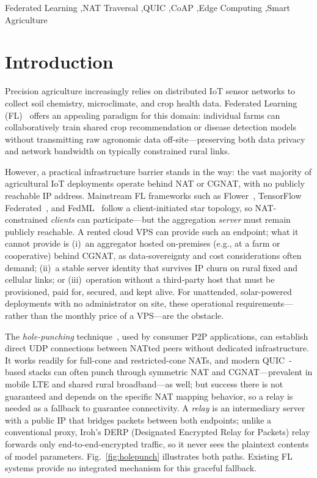 \documentclass[a4paper,fleqn]{cas-dc}
\begin{document}
\begin{keywords}
Federated Learning \sep NAT Traversal \sep QUIC \sep CoAP \sep Edge Computing \sep Smart Agriculture
\end{keywords}

\maketitle

\section{Introduction}
\label{sec:introduction}

Precision agriculture increasingly relies on distributed IoT sensor networks to collect soil chemistry, microclimate, and crop health data. Federated Learning (FL)~\cite{mcmahan2017} offers an appealing paradigm for this domain: individual farms can collaboratively train shared crop recommendation or disease detection models without transmitting raw agronomic data off-site---preserving both data privacy and network bandwidth on typically constrained rural links.

However, a practical infrastructure barrier stands in the way: the vast majority of agricultural IoT deployments operate behind NAT or CGNAT, with no publicly reachable IP address. Mainstream FL frameworks such as Flower~\cite{flower2022}, TensorFlow Federated~\cite{tff2019}, and FedML~\cite{fedml2020} follow a client-initiated star topology, so NAT-constrained \emph{clients} can participate---but the aggregation \emph{server} must remain publicly reachable. A rented cloud VPS can provide such an endpoint; what it cannot provide is (i)~an aggregator hosted on-premises (e.g., at a farm or cooperative) behind CGNAT, as data-sovereignty and cost considerations often demand; (ii)~a stable server identity that survives IP churn on rural fixed and cellular links; or (iii)~operation without a third-party host that must be provisioned, paid for, secured, and kept alive. For unattended, solar-powered deployments with no administrator on site, these operational requirements---rather than the monthly price of a VPS---are the obstacle.

The \emph{hole-punching} technique~\cite{ford2005}, used by consumer P2P applications, can establish direct UDP connections between NATted peers without dedicated infrastructure. It works readily for full-cone and restricted-cone NATs, and modern QUIC~\cite{rfc9000}-based stacks can often punch through symmetric NAT and CGNAT---prevalent in mobile LTE and shared rural broadband---as well; but success there is not guaranteed and depends on the specific NAT mapping behavior, so a relay is needed as a fallback to guarantee connectivity. A \emph{relay} is an intermediary server with a public IP that bridges packets between both endpoints; unlike a conventional proxy, Iroh's DERP (Designated Encrypted Relay for Packets) relay forwards only end-to-end-encrypted traffic, so it never sees the plaintext contents of model parameters. Fig.~\ref{fig:holepunch} illustrates both paths. Existing FL systems provide no integrated mechanism for this graceful fallback.
\end{document}
